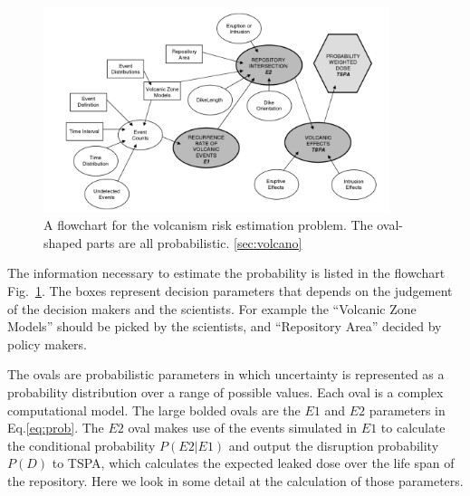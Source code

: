 \documentclass[nofootinbib,preprint,aps]{revtex4-1}
\begin{document}
        \begin{figure}[h]
            \centering
            \includegraphics[width=0.9\textwidth]{volcano.png}
            \caption{A flowchart for the volcanism risk estimation problem. The oval-shaped
            parts are all probabilistic. \ref{sec:volcano} \cite{cv14}}
            \label{fig:volcanos}
        \end{figure}

        The information necessary to estimate the probability is listed in the flowchart Fig.~\ref{fig:volcanos}.
        The boxes represent decision parameters that depends on the judgement of the decision makers and
        the scientists. For example the ``Volcanic Zone Models'' should be picked by the scientists, and
        ``Repository Area'' decided by policy makers.
        
        The ovals are probabilistic parameters in which uncertainty
        is represented as a probability distribution over a range of possible values.
        Each oval is a complex computational model.
        The large bolded ovals are the $E1$ and $E2$ parameters in Eq.\ref{eq:prob}.
        The $E2$ oval makes
        use of the events simulated in $E1$ to calculate the conditional probability $P(E2|E1)$ and output
        the disruption probability $P(D)$ to TSPA, which calculates the expected leaked dose over the
        life span of the repository. Here we look in some detail at the calculation of those parameters.
\end{document}
